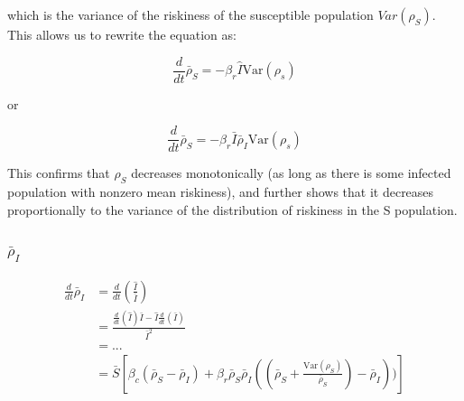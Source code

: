 \documentclass{article}
\begin{document}
which is the variance of the riskiness of the susceptible population
$Var(\rho_S)$. This allows us to rewrite the equation as:

$$
\frac{d}{dt}\bar\rho_S = -\beta_r \hat I \text{Var}(\rho_s)
$$

or

$$
\frac{d}{dt}\bar\rho_S = -\beta_r \bar I \bar\rho_I \text{Var}(\rho_s)
$$

This confirms that $\rho_S$ decreases monotonically (as long as there is some
infected population with nonzero mean riskiness), and further shows that
it decreases proportionally to the variance of the distribution of riskiness
in the S population.

\subsubsection{$\bar\rho_I$}



\begin{align*}
\frac{d}{dt}\bar\rho_I
&= \frac{d}{dt} \left( \frac{\hat I}{\bar I} \right)\\
&= \frac{\frac{d}{dt} (\hat I) \bar I - \hat I \frac{d}{dt}(\bar I)}{\bar I^2}\\
&=  ...
\\
&= \bar S \left[
	\beta_c (\bar\rho_S - \bar\rho_I)
	+ \beta_r \bar\rho_S \bar\rho_I((\bar\rho_S + \frac{\text{Var}(\rho_S)}{\bar\rho_S})
		- \bar\rho_I))
\right]
\end{align*}
\end{document}
